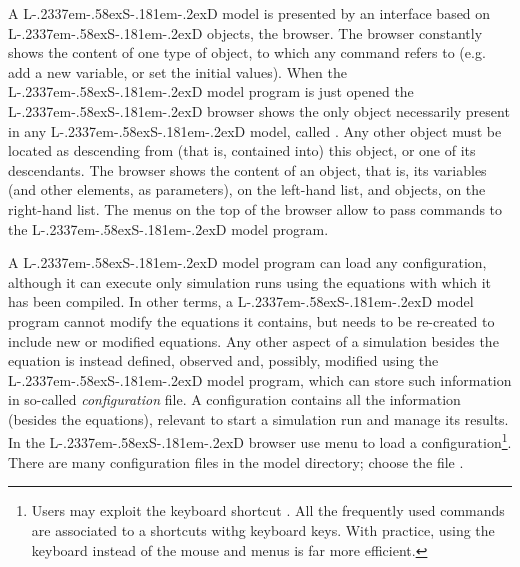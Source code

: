 \documentclass [11pt,a4paper] {book}
\def\LsD{{L\kern-.2337em\lower-.58ex\hbox{S}\kern-.181em\lower-.2ex\hbox{D}}\xspace}
\begin{document}
A \LsD model is presented by an interface based on \LsD objects, the browser. The browser constantly shows the content of one type of object, to which any command refers to (e.g. add a new variable, or set the initial values). When the \LsD model program is just opened the \LsD browser shows the only object necessarily present in any \LsD model, called . Any other object must be located as descending from (that is, contained into) this object, or one of its descendants. The browser shows the content of an object, that is, its variables (and other elements, as parameters), on the left-hand list, and objects, on the right-hand list. The menus on the top of the browser allow to pass commands to the \LsD model program.

A \LsD model program can load any configuration, although it can execute only simulation runs using the equations with which it has been compiled. In other terms, a \LsD model program cannot modify the equations it contains, but needs to be re-created to include new or modified equations. Any other aspect of a simulation besides the equation is instead defined, observed and, possibly, modified using the \LsD model program, which can store such information in so-called \textit{configuration} file. A configuration contains all the information (besides the equations), relevant to start a simulation run and manage its results. In the \LsD browser use menu  to load a configuration\footnote{Users may exploit the keyboard shortcut \footnotesize. All the frequently used commands are associated to a shortcuts withg keyboard keys. With practice, using the keyboard instead of the mouse and menus is far more efficient.}. There are many configuration files in the model directory; choose the file . 
\end{document}
